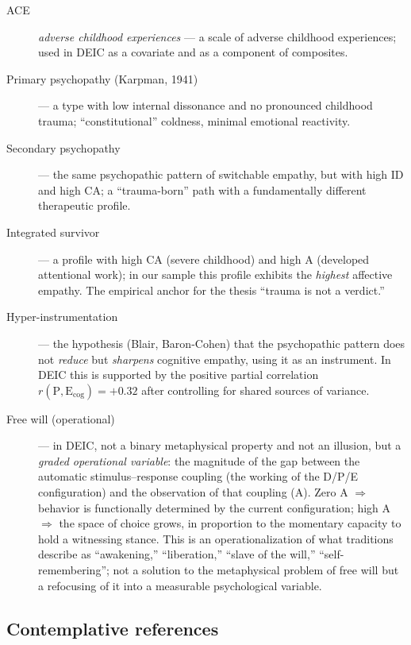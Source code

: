 \begin{description}
    \item[ACE] \textit{adverse childhood experiences} --- a scale of adverse childhood experiences; used in DEIC as a covariate and as a component of composites.
    \item[Primary psychopathy (Karpman, 1941)] --- a type with low internal dissonance and no pronounced childhood trauma; ``constitutional'' coldness, minimal emotional reactivity.
    \item[Secondary psychopathy] --- the same psychopathic pattern of switchable empathy, but with high ID and high CA; a ``trauma-born'' path with a fundamentally different therapeutic profile.
    \item[Integrated survivor] --- a profile with high CA (severe childhood) and high A (developed attentional work); in our sample this profile exhibits the \emph{highest} affective empathy. The empirical anchor for the thesis ``trauma is not a verdict.''
    \item[Hyper-instrumentation] --- the hypothesis (Blair, Baron-Cohen) that the psychopathic pattern does not \emph{reduce} but \emph{sharpens} cognitive empathy, using it as an instrument. In DEIC this is supported by the positive partial correlation $r(\text{P}, \text{E}_{\text{cog}}) = +0.32$ after controlling for shared sources of variance.
    \item[Free will (operational)] --- in DEIC, not a binary metaphysical property and not an illusion, but a \emph{graded operational variable}: the magnitude of the gap between the automatic stimulus--response coupling (the working of the D/P/E configuration) and the observation of that coupling (A). Zero A $\Rightarrow$ behavior is functionally determined by the current configuration; high A $\Rightarrow$ the space of choice grows, in proportion to the momentary capacity to hold a witnessing stance. This is an operationalization of what traditions describe as ``awakening,'' ``liberation,'' ``slave of the will,'' ``self-remembering''; not a solution to the metaphysical problem of free will but a refocusing of it into a measurable psychological variable.
\end{description}

\subsection*{Contemplative references}

